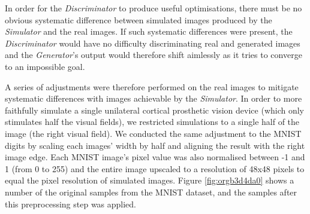 \documentclass[a4paper,11pt,openany]{book}
\begin{document}
In order for the \emph{Discriminator} to produce useful optimisations, there must be no obvious systematic difference between simulated images produced by the \emph{Simulator} and the real images.
If such systematic differences were present, the \emph{Discriminator} would have no difficulty discriminating real and generated images and the \emph{Generator}'s output would therefore shift aimlessly as it tries to converge to an impossible goal.

A series of adjustments were therefore performed on the real images to mitigate systematic differences with images achievable by the \emph{Simulator}.
In order to more faithfully simulate a single unilateral cortical prosthetic vision device (which only stimulates half the visual fields), we restricted simulations to a single half of the image (the right visual field).
We conducted the same adjustment to the MNIST digits by scaling each images' width by half and aligning the result with the right image edge.
Each MNIST image's pixel value was also normalised between -1 and 1 (from 0 to 255) and the entire image upscaled to a resolution of 48x48 pixels to equal the pixel resolution of simulated images.
Figure \ref{fig:orgb3d4da0} shows a number of the original samples from the MNIST dataset, and the samples after this preprocessing step was applied.
\end{document}
